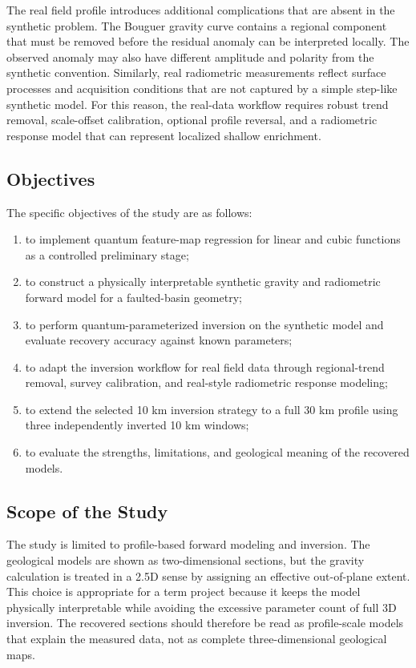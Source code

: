 \documentclass[12pt,a4paper]{article}
\begin{document}
The real field profile introduces additional complications that are absent in the synthetic problem. The Bouguer gravity curve contains a regional component that must be removed before the residual anomaly can be interpreted locally. The observed anomaly may also have different amplitude and polarity from the synthetic convention. Similarly, real radiometric measurements reflect surface processes and acquisition conditions that are not captured by a simple step-like synthetic model. For this reason, the real-data workflow requires robust trend removal, scale-offset calibration, optional profile reversal, and a radiometric response model that can represent localized shallow enrichment.

\subsection{Objectives}
The specific objectives of the study are as follows:
\begin{enumerate}
    \item to implement quantum feature-map regression for linear and cubic functions as a controlled preliminary stage;
    \item to construct a physically interpretable synthetic gravity and radiometric forward model for a faulted-basin geometry;
    \item to perform quantum-parameterized inversion on the synthetic model and evaluate recovery accuracy against known parameters;
    \item to adapt the inversion workflow for real field data through regional-trend removal, survey calibration, and real-style radiometric response modeling;
    \item to extend the selected 10 km inversion strategy to a full 30 km profile using three independently inverted 10 km windows;
    \item to evaluate the strengths, limitations, and geological meaning of the recovered models.
\end{enumerate}

\subsection{Scope of the Study}
The study is limited to profile-based forward modeling and inversion. The geological models are shown as two-dimensional sections, but the gravity calculation is treated in a 2.5D sense by assigning an effective out-of-plane extent. This choice is appropriate for a term project because it keeps the model physically interpretable while avoiding the excessive parameter count of full 3D inversion. The recovered sections should therefore be read as profile-scale models that explain the measured data, not as complete three-dimensional geological maps.
\end{document}
